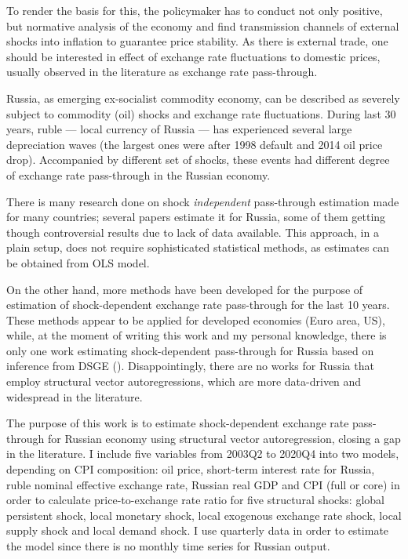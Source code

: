 \documentclass[12pt, a4paper]{extarticle}
\begin{document}
To render the basis for this, the policymaker has to conduct not only positive, but normative analysis of the economy and find transmission channels of external shocks into inflation to guarantee price stability. As there is external trade, one should be interested in effect of exchange rate fluctuations to domestic prices, usually observed in the literature as exchange rate pass-through.

Russia, as emerging ex-socialist commodity economy, can be described as severely subject to commodity (oil) shocks and exchange rate fluctuations. During last 30 years, ruble --- local currency of Russia --- has experienced several large depreciation waves (the largest ones were after 1998 default and 2014 oil price drop). Accompanied by different set of shocks, these events had different degree of exchange rate pass-through in the Russian economy. 

There is many research done on shock \textit{independent} pass-through estimation made for many countries; several papers estimate it for Russia, some of them getting though controversial results due to lack of data available. This approach, in a plain setup, does not require sophisticated statistical methods, as estimates can be obtained from OLS model.

On the other hand, more methods have been developed for the purpose of estimation of shock-dependent exchange rate pass-through for the last 10 years. These methods appear to be applied for developed economies (Euro area, US), while, at the moment of writing this work and my personal knowledge, there is only one work estimating shock-dependent pass-through for Russia based on inference from DSGE (\cite{Khotulev2020}). Disappointingly, there are no works for Russia that employ structural vector autoregressions, which are more data-driven and widespread in the literature.

The purpose of this work is to estimate shock-dependent exchange rate pass-through for Russian economy using structural vector autoregression, closing a gap in the literature. I include five variables from 2003Q2 to 2020Q4 into two models, depending on CPI composition: oil price, short-term interest rate for Russia, ruble nominal effective exchange rate, Russian real GDP and CPI (full or core) in order to calculate price-to-exchange rate ratio for five structural shocks: global persistent shock, local monetary shock, local exogenous exchange rate shock, local supply shock and local demand shock. I use quarterly data in order to estimate the model since there is no monthly time series for Russian output.
\end{document}
